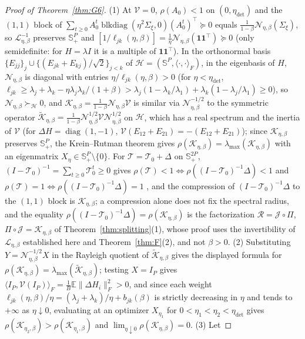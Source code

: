 \documentclass[11pt]{article}
\theoremstyle{remark}
\newcommand{\E}{\mathbb{E}}
\begin{document}
\begin{proof}[Proof of Theorem~\ref{thm:G6}]
(1) At $\mathcal V=0$, $\rho(A_0)<1$ on $(0,\eta_{\mathrm{det}})$ and the $(1,1)$ block of $\sum_{t\ge0}A_0^t\operatorname{blkdiag}(\eta^2\Sigma_\xi,0)(A_0^t)^\top\succeq0$ equals $\frac1{1-\beta}\mathcal N_{\eta,\beta}(\Sigma_\xi)$, so $\mathcal L_{\eta,\beta}^{-1}$ preserves $\mathbb S_+^P$ and $[1/\ell_{jk}(\eta,\beta)]=\frac1\eta\mathcal N_{\eta,\beta}(\mathbf 1\mathbf 1^\top)\succeq0$ (only semidefinite: for $H=\lambda I$ it is a multiple of $\mathbf 1\mathbf 1^\top$). In the orthonormal basis $\{E_{jj}\}_j\cup\{(E_{jk}+E_{kj})/\sqrt2\}_{j<k}$ of $\mathcal H=(\mathbb S^P,\langle\cdot,\cdot\rangle_F)$, in the eigenbasis of $H$, $\mathcal N_{\eta,\beta}$ is diagonal with entries $\eta/\ell_{jk}(\eta,\beta)>0$ (for $\eta<\eta_{\mathrm{det}}$, $\ell_{jk}\ge\lambda_j+\lambda_k-\eta\lambda_j\lambda_k/(1+\beta)>\lambda_j(1-\lambda_k/\lambda_1)+\lambda_k(1-\lambda_j/\lambda_1)\ge0$), so $\mathcal N_{\eta,\beta}\succ_{\mathcal H}0$, and $\mathcal K_{\eta,\beta}=\frac1{1-\beta}\mathcal N_{\eta,\beta}\mathcal V$ is similar via $\mathcal N_{\eta,\beta}^{-1/2}$ to the symmetric operator $\widetilde{\mathcal K}_{\eta,\beta}=\frac1{1-\beta}\mathcal N_{\eta,\beta}^{1/2}\mathcal V\mathcal N_{\eta,\beta}^{1/2}$ on $\mathcal H$, which has a real spectrum and the inertia of $\mathcal V$ (for $\Delta H=\operatorname{diag}(1,-1)$, $\mathcal V(E_{12}+E_{21})=-(E_{12}+E_{21})$); since $\mathcal K_{\eta,\beta}$ preserves $\mathbb S_+^P$, the Krein--Rutman theorem \citep{krein1948linear} gives $\rho(\mathcal K_{\eta,\beta})=\lambda_{\max}(\mathcal K_{\eta,\beta})$ with an eigenmatrix $X_\eta\in\mathbb S_+^P\setminus\{0\}$. For $\mathcal T=\mathcal T_0+\Delta$ on $\mathbb S_+^{2P}$, $(I-\mathcal T_0)^{-1}=\sum_{t\ge0}\mathcal T_0^t\ge0$ gives $\rho(\mathcal T)<1\iff\rho((I-\mathcal T_0)^{-1}\Delta)<1$ and $\rho(\mathcal T)=1\iff\rho((I-\mathcal T_0)^{-1}\Delta)=1$ \citep{berman1994}, and the compression of $(I-\mathcal T_0)^{-1}\Delta$ to the $(1,1)$ block is $\mathcal K_{\eta,\beta}$; a compression alone does not fix the spectral radius, and the equality $\rho((I-\mathcal T_0)^{-1}\Delta)=\rho(\mathcal K_{\eta,\beta})$ is the factorization $\mathcal R=\mathcal J\circ\Pi$, $\Pi\circ\mathcal J=\mathcal K_{\eta,\beta}$ of Theorem~\ref{thm:splitting}(1), whose proof uses the invertibility of $\mathcal L_{\eta,\beta}$ established here and Theorem~\ref{thm:F}(2), and not $\beta>0$. (2) Substituting $Y=\mathcal N_{\eta,\beta}^{-1/2}X$ in the Rayleigh quotient of $\widetilde{\mathcal K}_{\eta,\beta}$ gives the displayed formula for $\rho(\mathcal K_{\eta,\beta})=\lambda_{\max}(\widetilde{\mathcal K}_{\eta,\beta})$; testing $X=I_P$ gives $\langle I_P,\mathcal V(I_P)\rangle_F=\frac1B\E\|\Delta H_i\|_F^2>0$, and since each weight $\ell_{jk}(\eta,\beta)/\eta=(\lambda_j+\lambda_k)/\eta+b_{jk}(\beta)$ is strictly decreasing in $\eta$ and tends to $+\infty$ as $\eta\downarrow0$, evaluating at an optimizer $X_{\eta_1}$ for $0<\eta_1<\eta_2<\eta_{\mathrm{det}}$ gives $\rho(\mathcal K_{\eta_2,\beta})>\rho(\mathcal K_{\eta_1,\beta})$ and $\lim_{\eta\downarrow0}\rho(\mathcal K_{\eta,\beta})=0$. (3) Let 
\end{proof}
\end{document}
